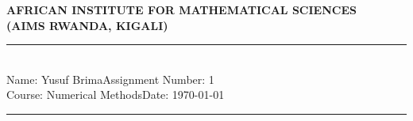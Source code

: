 \documentclass[12pt,a4paper]{article}
\newcommand{\student}{Yusuf Brima}
\newcommand{\course}{Numerical Methods}
\newcommand{\assignment}{1}
\begin{document}
\thispagestyle{empty}
\begin{center}
\textbf{AFRICAN INSTITUTE FOR MATHEMATICAL SCIENCES \\[0.5cm]
(AIMS RWANDA, KIGALI)}
\vspace{1.0cm}
\end{center}

\noindent
\rule{17cm}{0.2cm}\\[0.3cm]
Name: \student \hfill Assignment Number: \assignment\\[0.1cm]
Course: \course \hfill Date: \today\\
\rule{17cm}{0.05cm}
\vspace{1.0cm}
\end{document}
